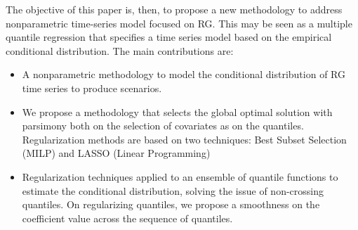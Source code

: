  
The objective of this paper is, then, to propose a new methodology to address nonparametric time-series model focused on RG. This may be seen as a multiple quantile regression that specifies a time series model based on the empirical conditional distribution. The main contributions are:
\begin{itemize}
	\item A nonparametric methodology to model the conditional distribution of RG time series to produce scenarios.
	
	\item We propose a methodology that selects the global optimal solution with parsimony both on the selection of covariates as on the quantiles. Regularization methods are based on two techniques: Best Subset Selection (MILP) and LASSO (Linear Programming) 
	
	\item Regularization techniques applied to an ensemble of quantile functions to estimate the conditional distribution, solving the issue of non-crossing quantiles. On regularizing quantiles, we propose a smoothness on the coefficient value across the sequence of quantiles.	
	
\end{itemize}






